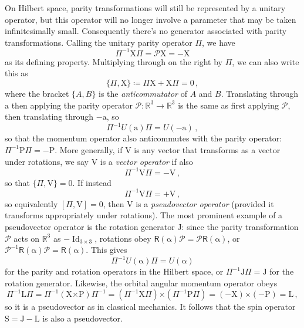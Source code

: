 \documentclass{article}
\theoremstyle{plain}\theoremheaderfont{\normalfont\itshape}\theorembodyfont{\rmfamily}\theoremseparator{.}\newtheorem*{rem}{Remark}\newtheorem*{ex}{Example}\newtheorem*{proof}{Proof}\newtheorem*{altp}{Alternative proof}
\theoremstyle{plain}\theoremheaderfont{\normalfont\bfseries}\theorembodyfont{\rmfamily}\theoremseparator{.}\newtheorem{thm}{Theorem}[section]\newtheorem{lem}[thm]{Lemma}\newtheorem{prop}[thm]{Proposition}\newtheorem*{cor}{Corollary}\newtheorem{defn}[thm]{Definition}\newtheorem{clm}[thm]{Claim}\newtheorem{clminproof}{Claim}
\theoremstyle{break}\theoremheaderfont{\normalfont\itshape}\theorembodyfont{\rmfamily}\theoremseparator{.\medskip}\newtheorem*{proofskip}{Proof}\newtheorem*{exs}{Examples}\newtheorem*{rems}{Remarks}
\theoremstyle{break}\theoremheaderfont{\normalfont\bfseries}\theorembodyfont{\rmfamily}\theoremseparator{.\medskip}\newtheorem{lemskip}[thm]{Lemma}\newtheorem{defnskip}[thm]{Definition}\newtheorem{propskip}[thm]{Proposition}\newtheorem{thmskip}[thm]{Theorem}
\numberwithin{equation}{section}
\newcommand{\vb}[1]{\bm{\mathrm{#1}}}
\newcommand{\cross}{\bm{\times}}
\DeclareMathOperator{\Id}{Id}
\newcommand{\RR}{\mathbb{R}}
\begin{document}
    On Hilbert space, parity transformations will still be represented by a unitary operator, but this operator will no longer involve a parameter that may be taken infinitesimally small. Consequently there's no generator associated with parity transformations. Calling the unitary parity operator \(\Pi\), we have
    \[\Pi^{-1}\vb{X}\Pi=\mathcal{P}\vb{X}=-\vb{X}\]
    as its defining property. Multiplying through on the right by \(\Pi\), we can also write this as
    \begin{equation}
        \{\Pi,\vb{X}\}\coloneqq\Pi\vb{X}+\vb{X}\Pi=0\,,
    \end{equation}
    where the bracket \(\{A,B\}\) is the \textit{anticommutator} of \(A\) and \(B\). Translating through \(\vb{a}\) then applying the parity operator \(\mathcal{P}:\RR^3\to\RR^3\) is the same as first applying \(\mathcal{P}\), then translating through \(-\vb{a}\), so
    \begin{equation}
        \Pi^{-1}U(\vb{a})\Pi=U(-\vb{a})\,,
    \end{equation}
    so that the momentum operator also anticommutes with the parity operator: \(\Pi^{-1}\vb{P}\Pi=-\vb{P}\). More generally, if \(\vb{V}\) is any vector that transforms as a vector under rotations, we say \(\vb{V}\) is a \textit{vector operator} if also
    \begin{equation}\label{parity_inversion_vector}
        \Pi^{-1}\vb{V}\Pi=-\vb{V}\,,
    \end{equation}
    so that \(\{\Pi,\vb{V}\}=0\). If instead
    \begin{equation}
        \Pi^{-1}\vb{V}\Pi=+\vb{V}\,,
    \end{equation}
    so equivalently \([\Pi,\vb{V}]=0\), then \(\vb{V}\) is a \textit{pseudovector operator} (provided it transforms appropriately under rotations). The most prominent example of a pseudovector operator is the rotation generator \(\vb{J}\): since the parity transformation \(\mathcal{P}\) acts on \(\RR^3\) as \(-\Id_{3\times 3}\), rotations obey \(\mathsf{R}(\vb{\alpha})\mathcal{P}=\mathcal{P}\mathsf{R}(\vb{\alpha})\), or \(\mathcal{P}^{-1}\mathsf{R}(\vb{\alpha})\mathcal{P}=\mathsf{R}(\vb{\alpha})\). This gives
    \begin{equation}
        \Pi^{-1}U(\vb{\alpha})\Pi=U(\vb{\alpha})
    \end{equation}
    for the parity and rotation operators in the Hilbert space, or \(\Pi^{-1}\vb{J}\Pi=\vb{J}\) for the rotation generator. Likewise, the orbital angular momentum operator obeys
    \begin{equation}
        \Pi^{-1}\vb{L}\Pi=\Pi^{-1}(\vb{X}\cross\vb{P})\Pi^{-1}=(\Pi^{-1}\vb{X}\Pi)\cross(\Pi^{-1}\vb{P}\Pi)=(-\vb{X})\cross(-\vb{P})=\vb{L}\,,
    \end{equation}
    so it is a pseudovector as in classical mechanics. It follows that the spin operator \(\vb{S}=\vb{J}-\vb{L}\) is also a pseudovector.
\end{document}
